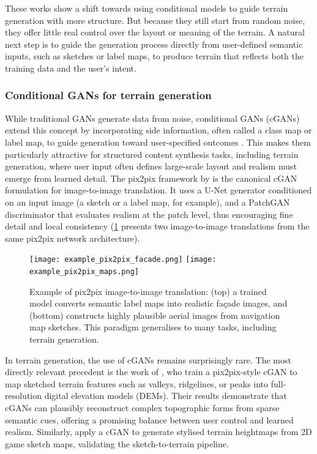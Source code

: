 These works show a shift towards using conditional models to guide terrain generation with more structure. But because they still start from random noise, they offer little real control over the layout or meaning of the terrain. A natural next step is to guide the generation process directly from user-defined semantic inputs, such as sketches or label maps, to produce terrain that reflects both the training data and the user's intent.


\subsubsection{Conditional GANs for terrain generation}
\label{sec:coral-island-sota-cGAN}

While traditional GANs generate data from noise, conditional GANs (cGANs) extend this concept by incorporating side information, often called a class map or label map, to guide generation toward user-specified outcomes \cite{Mirza2014}. This makes them particularly attractive for structured content synthesis tasks, including terrain generation, where user input often defines large-scale layout and realism must emerge from learned detail. The pix2pix framework by \cite{Isola2017} is the canonical cGAN formulation for image-to-image translation. It uses a U-Net generator conditioned on an input image (a sketch or a label map, for example), and a PatchGAN discriminator that evaluates realism at the patch level, thus encouraging fine detail and local consistency (\cref{fig:coral-island-pix2pix-example} presents two image-to-image translations from the same pix2pix network architecture).

\begin{figure}
    \texttt{[image: example\_pix2pix\_facade.png]}
    \texttt{[image: example\_pix2pix\_maps.png]}
    \caption{Example of pix2pix image-to-image translation: (top) a trained model converts semantic label maps into realistic façade images, and (bottom) constructs highly plausible aerial images from navigation map sketches. This paradigm generalises to many tasks, including terrain generation.}
    \label{fig:coral-island-pix2pix-example}
\end{figure}

In terrain generation, the use of cGANs remains surprisingly rare. The most directly relevant precedent is the work of \cite{Guerin2017}, who train a pix2pix-style cGAN to map sketched terrain features such as valleys, ridgelines, or peaks into full-resolution digital elevation models (DEMs). Their results demonstrate that cGANs can plausibly reconstruct complex topographic forms from sparse semantic cues, offering a promising balance between user control and learned realism. Similarly, \cite{Sisodia2022} apply a cGAN to generate stylised terrain heightmaps from 2D game sketch maps, validating the sketch-to-terrain pipeline.

